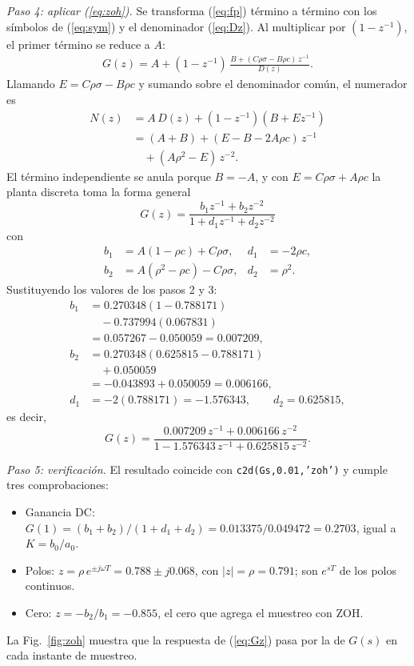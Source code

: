 \documentclass[conference]{IEEEtran}
\begin{document}
\textit{Paso 4: aplicar (\ref{eq:zoh}).} Se transforma (\ref{eq:fp}) término
a término con los símbolos de (\ref{eq:sym}) y el denominador (\ref{eq:Dz}).
Al multiplicar por $(1-z^{-1})$, el primer término se reduce a $A$:
\begin{align*}
  G(z) = A + (1-z^{-1})\,\frac{B + (C\rho\sigma - B\rho c)\,z^{-1}}{D(z)}.
\end{align*}
Llamando $E = C\rho\sigma - B\rho c$ y sumando sobre el denominador común, el
numerador es
\begin{align*}
  N(z) &= A\,D(z) + (1-z^{-1})(B + E z^{-1})\\
       &= (A+B) + (E - B - 2A\rho c)\,z^{-1}\\
       &\quad + (A\rho^2 - E)\,z^{-2}.
\end{align*}
El término independiente se anula porque $B = -A$, y con $E = C\rho\sigma +
A\rho c$ la planta discreta toma la forma general
\begin{equation}
  G(z) = \frac{b_1z^{-1} + b_2z^{-2}}{1 + d_1z^{-1} + d_2z^{-2}}
  \label{eq:Gzgen}
\end{equation}
con
\begin{align*}
  b_1 &= A(1-\rho c) + C\rho\sigma, & d_1 &= -2\rho c,\\
  b_2 &= A(\rho^2-\rho c) - C\rho\sigma, & d_2 &= \rho^2.
\end{align*}
Sustituyendo los valores de los pasos 2 y 3:
\begin{align*}
  b_1 &= 0.270348(1 - 0.788171)\\
      &\quad - 0.737994(0.067831)\\
      &= 0.057267 - 0.050059 = 0.007209,\\[3pt]
  b_2 &= 0.270348(0.625815 - 0.788171)\\
      &\quad + 0.050059\\
      &= -0.043893 + 0.050059 = 0.006166,\\[3pt]
  d_1 &= -2(0.788171) = -1.576343,\qquad d_2 = 0.625815,
\end{align*}
es decir,
\begin{equation}
  G(z) = \frac{0.007209\,z^{-1} + 0.006166\,z^{-2}}{1 - 1.576343\,z^{-1} + 0.625815\,z^{-2}}.
  \label{eq:Gz}
\end{equation}

\textit{Paso 5: verificación.} El resultado coincide con
\texttt{c2d(Gs,0.01,'zoh')} y cumple tres comprobaciones:
\begin{itemize}
  \item Ganancia DC: $G(1) = (b_1+b_2)/(1+d_1+d_2) = 0.013375/0.049472
        = 0.2703$, igual a $K = b_0/a_0$.
  \item Polos: $z = \rho\,e^{\pm j\omega T} = 0.788 \pm j0.068$, con
        $|z| = \rho = 0.791$; son $e^{sT}$ de los polos continuos.
  \item Cero: $z = -b_2/b_1 = -0.855$, el cero que agrega el muestreo con ZOH.
\end{itemize}
La Fig.~\ref{fig:zoh} muestra que la respuesta de (\ref{eq:Gz}) pasa por la de
$G(s)$ en cada instante de muestreo.
\end{document}
